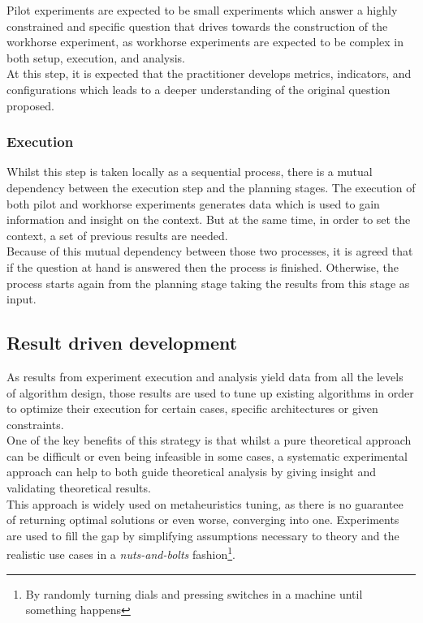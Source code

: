 Pilot experiments are expected to be small experiments which answer a highly constrained and specific question that drives towards the construction of the workhorse experiment, as workhorse experiments are expected to be complex in both setup, execution, and analysis. \\

At this step, it is expected that the practitioner develops metrics, indicators, and configurations which leads to a deeper understanding of the original question proposed.\\

\subsubsection{Execution}
Whilst this step is taken locally as a sequential process, there is a mutual dependency between the execution step and the planning stages. The execution of both pilot and workhorse experiments generates data which is used to gain information and insight on the context. But at the same time, in order to set the context, a set of previous results are needed. \\

Because of this mutual dependency between those two processes, it is agreed that if the question at hand is answered then the process is finished. Otherwise, the process starts again from the planning stage taking the results from this stage as input.\\

\subsection{Result driven development}
As results from experiment execution and analysis yield data from all the levels of algorithm design, those results are used to tune up existing algorithms in order to optimize their execution for certain cases, specific architectures or given constraints.\\

One of the key benefits of this strategy is that whilst a pure theoretical approach can be difficult or even being infeasible in some cases, a systematic experimental approach can help to both guide theoretical analysis by giving insight and validating theoretical results.\\

This approach is widely used on metaheuristics tuning, as there is no guarantee of returning optimal solutions or even worse, converging into one. Experiments are used to fill the gap by simplifying assumptions necessary to theory and the realistic use cases in a \emph{nuts-and-bolts} fashion\footnote{By randomly turning dials and pressing switches in a machine until something happens}. \\

